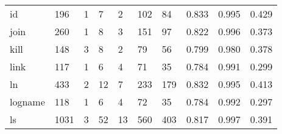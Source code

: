 \begin{longtable}{lp{2.0cm}p{2.0cm}p{2.0cm}p{2.0cm}p{2.0cm}p{2.0cm}p{2.0cm}p{2.0cm}p{2.0cm}}
id        &                    196 &                                  1 &                                 7 &                                2 &                               102 &                              84 &                                   0.833 &                                  0.995 &                                0.429 \\
join      &                    260 &                                  1 &                                 8 &                                3 &                               151 &                              97 &                                   0.822 &                                  0.996 &                                0.373 \\
kill      &                    148 &                                  3 &                                 8 &                                2 &                                79 &                              56 &                                   0.799 &                                  0.980 &                                0.378 \\
link      &                    117 &                                  1 &                                 6 &                                4 &                                71 &                              35 &                                   0.784 &                                  0.991 &                                0.299 \\
ln        &                    433 &                                  2 &                                12 &                                7 &                               233 &                             179 &                                   0.832 &                                  0.995 &                                0.413 \\
logname   &                    118 &                                  1 &                                 6 &                                4 &                                72 &                              35 &                                   0.784 &                                  0.992 &                                0.297 \\
ls        &                   1031 &                                  3 &                                52 &                               13 &                               560 &                             403 &                                   0.817 &                                  0.997 &                                0.391 \\

\end{longtable}
